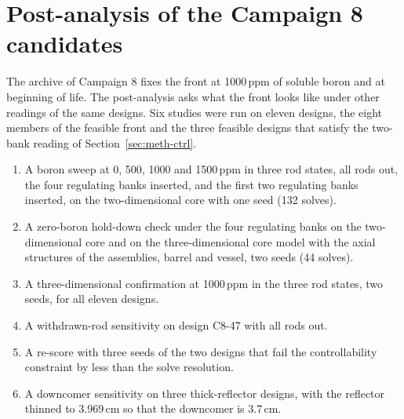 
\section{Post-analysis of the Campaign 8 candidates}
\label{sec:res-c8-post}

The archive of Campaign 8 fixes the front at 1000\,ppm of soluble boron
and at beginning of life. The post-analysis asks what the front looks
like under other readings of the same designs. Six studies were run on
eleven designs, the eight members of the feasible front and the three
feasible designs that satisfy the two-bank reading of
Section~\ref{sec:meth-ctrl}.

\begin{enumerate}
  \item A boron sweep at 0, 500, 1000 and 1500\,ppm in three rod
        states, all rods out, the four regulating banks inserted, and the
        first two regulating banks inserted, on the two-dimensional core
        with one seed (132 solves).

  \item A zero-boron hold-down check under the four regulating banks on
        the two-dimensional core and on the three-dimensional core model with the axial structures of the assemblies, barrel and vessel, two seeds (44 solves).

  \item A three-dimensional confirmation at 1000\,ppm in the three rod
        states, two seeds, for all eleven designs.

  \item A withdrawn-rod sensitivity on design C8-47 with all rods out.

  \item A re-score with three seeds of the two designs that fail the
        controllability constraint by less than the solve resolution.

  \item A downcomer sensitivity on three thick-reflector designs, with
        the reflector thinned to 3.969\,cm so that the downcomer is 3.7\,cm.
\end{enumerate}

